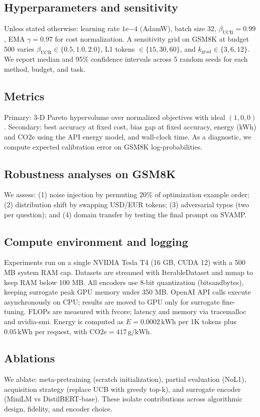 \documentclass{article}
\begin{document}
\subsection{Hyperparameters and sensitivity}
Unless stated otherwise: learning rate \(1\mathrm{e}{-4}\) (AdamW), batch size 32, \(\beta_{\mathrm{UCB}} = 0.99\), EMA \(\gamma = 0.97\) for cost normalization. A sensitivity grid on GSM8K at budget 500 varies \(\beta_{\mathrm{UCB}} \in \{0.5, 1.0, 2.0\}\), L1 tokens \(\in \{15, 30, 60\}\), and \(k_{\mathrm{grad}} \in \{3, 6, 12\}\). We report median and 95\% confidence intervals across 5 random seeds for each method, budget, and task.

\subsection{Metrics}
Primary: 3-D Pareto hypervolume over normalized objectives with ideal \((1, 0, 0)\). Secondary: best accuracy at fixed cost, bias gap at fixed accuracy, energy (kWh) and CO2e using the API energy model, and wall-clock time. As a diagnostic, we compute expected calibration error on GSM8K log-probabilities.

\subsection{Robustness analyses on GSM8K}
We assess: (1) noise injection by permuting 20\% of optimization example order; (2) distribution shift by swapping USD/EUR tokens; (3) adversarial typos (two per question); and (4) domain transfer by testing the final prompt on SVAMP.

\subsection{Compute environment and logging}
Experiments run on a single NVIDIA Tesla T4 (16 GB, CUDA 12) with a 500 MB system RAM cap. Datasets are streamed with IterableDataset and mmap to keep RAM below 100 MB. All encoders use 8-bit quantization (bitsandbytes), keeping surrogate peak GPU memory under 350 MB. OpenAI API calls execute asynchronously on CPU; results are moved to GPU only for surrogate fine-tuning. FLOPs are measured with fvcore; latency and memory via tracemalloc and nvidia-smi. Energy is computed as \(E = 0.0002\,\mathrm{kWh}\) per 1K tokens plus \(0.05\,\mathrm{kWh}\) per request, with \(\mathrm{CO2e} = 417\,\mathrm{g}/\mathrm{kWh}\).

\subsection{Ablations}
We ablate: meta-pretraining (scratch initialization), partial evaluation (NoL1), acquisition strategy (replace UCB with greedy top-k), and surrogate encoder (MiniLM vs DistilBERT-base). These isolate contributions across algorithmic design, fidelity, and encoder choice.
\end{document}
